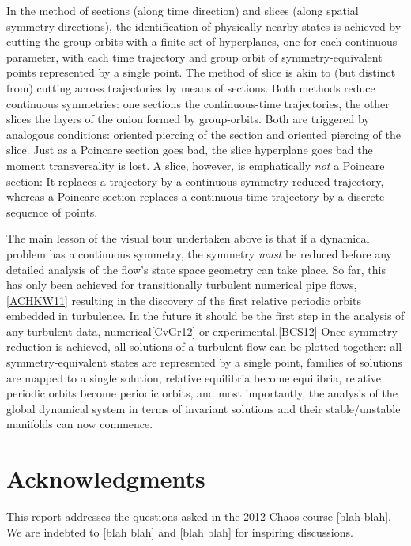 \documentclass{article}
\begin{document}
In the method of sections (along time direction) and slices (along
spatial symmetry directions), the identification of physically nearby
states is achieved by cutting the group orbits with a finite set of
hyperplanes, one for each continuous parameter, with each time trajectory
and group orbit of symmetry-equivalent points represented by a single
point. The method of slice is akin to (but distinct
from) cutting across trajectories by means of sections. Both methods
reduce continuous symmetries: one sections the continuous-time
trajectories, the other slices the layers of the onion formed by
group-orbits. Both are triggered by analogous conditions: oriented
piercing of the section and oriented piercing of the slice. Just as a
 Poincare section goes bad, the slice hyperplane goes bad the moment
transversality is lost. A slice, however, is emphatically \emph{not} a
Poincare section: It replaces a trajectory by a continuous symmetry-reduced
trajectory, whereas a Poincare section replaces a continuous time trajectory by
a discrete sequence of points.

The main lesson of the visual tour undertaken above is that if a
dynamical problem has a continuous symmetry, the symmetry \emph{must} be
reduced before any detailed analysis of the flow's state space geometry can
take place. So far, this has only been achieved for transitionally
turbulent numerical pipe flows,\ref{ACHKW11} resulting in the discovery of
the first relative periodic orbits embedded in turbulence. In the future it should be the
first step in the analysis of any turbulent data, numerical\ref{CvGr12} or
experimental.\ref{BCS12} Once symmetry reduction is achieved, all
solutions of a turbulent flow can be plotted together: all
symmetry-equivalent states are represented by a single point, families of
solutions are mapped to a single solution, relative equilibria become equilibria, relative periodic orbits 
become periodic orbits, and most importantly, the analysis of the global dynamical
system in terms of invariant solutions and their stable/unstable
manifolds can now commence.

\section*{Acknowledgments}
This report addresses the questions asked in the  2012 Chaos course
[blah blah]. We are indebted to [blah blah] and [blah blah] for inspiring discussions.




\end{document}
